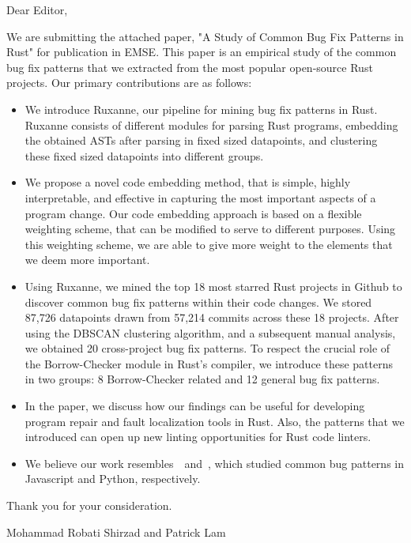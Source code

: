 \documentclass{letter}
\begin{document}
\begin{letter}{}
\opening{Dear Editor,}

We are submitting the attached paper, "A Study of Common Bug Fix Patterns in Rust"
for publication in EMSE. This paper is an empirical study of the common bug fix patterns that we extracted from the most popular open-source Rust projects. Our primary contributions are as follows:

\begin{itemize}
    \item We introduce Ruxanne, our pipeline for mining bug fix patterns in Rust. Ruxanne consists of different modules for parsing Rust programs, embedding the obtained ASTs after parsing in fixed sized datapoints, and clustering these fixed sized datapoints into different groups. 
    \item We propose a novel code embedding method, that is simple, highly interpretable, and effective in capturing the most important aspects of a program change. Our code embedding approach is based on a flexible weighting scheme, that can be modified to serve to different purposes. Using this weighting scheme, we are able to give more weight to the elements that we deem more important. %
    \item Using Ruxanne, we mined the top 18 most starred Rust projects in Github to discover common bug fix patterns within their code changes. We stored 87,726 datapoints drawn from 57,214 commits across these 18 projects. After using the DBSCAN clustering algorithm, and a subsequent manual analysis, we obtained 20 cross-project bug fix patterns. To respect the crucial role of the Borrow-Checker module in Rust's compiler, we introduce these patterns in two groups: 8 Borrow-Checker related and 12 general bug fix patterns.
    \item In the paper, we discuss how our findings can be useful for developing program repair and fault localization tools in Rust. Also, the patterns that we introduced can open up new linting opportunities for Rust code linters. 
    \item We believe our work resembles~\cite{hanam2016discovering}~and~\cite{yang2022mining}, which studied common bug patterns in Javascript and Python, respectively.  
\end{itemize}

Thank you for your consideration.

Mohammad Robati Shirzad and Patrick Lam

\small



\end{letter} 
\end{document}
